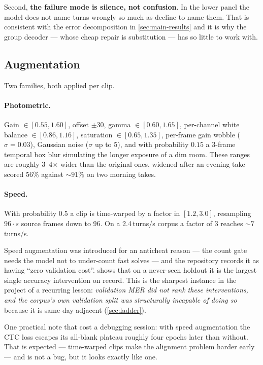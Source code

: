 Second, \textbf{the failure mode is silence, not confusion}. In the lower
panel the model does not name turns wrongly so much as decline to name them.
That is consistent with the error decomposition in \cref{sec:main-results}
and it is why the group decoder --- whose cheap repair is substitution ---
has so little to work with.

\subsection{Augmentation}
\label{sec:aug}

Two families, both applied per clip.

\paragraph{Photometric.} Gain $\in[0.55,1.60]$, offset $\pm 30$, gamma
$\in[0.60,1.65]$, per-channel white balance $\in[0.86,1.16]$, saturation
$\in[0.65,1.35]$, per-frame gain wobble ($\sigma=0.03$), Gaussian noise
($\sigma$ up to 5), and with probability $0.15$ a 3-frame temporal box blur
simulating the longer exposure of a dim room. These ranges are roughly
3--4$\times$ wider than the original ones, widened after an evening take
scored 56\% against ${\sim}91\%$ on two morning takes.

\paragraph{Speed.} With probability $0.5$ a clip is time-warped by a factor
in $[1.2, 3.0]$, resampling $96\cdot s$ source frames down to 96. On a
2.4\,turns/s corpus a factor of 3 reaches ${\sim}7$\,turns/s.

Speed augmentation was introduced for an anticheat reason --- the count gate
needs the model not to under-count fast solves --- and the repository records
it as having ``zero validation cost''.  shows that on a
never-seen holdout it is the largest single accuracy intervention on record.
This is the sharpest instance in the project of a recurring lesson:
\emph{validation MER did not rank these interventions, and the corpus's own
validation split was structurally incapable of doing so} because it is
same-day adjacent (\cref{sec:ladder}).

One practical note that cost a debugging session: with speed augmentation the
CTC loss escapes its all-blank plateau roughly four epochs later than
without. That is expected --- time-warped clips make the alignment problem
harder early --- and is not a bug, but it looks exactly like one.

